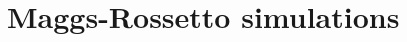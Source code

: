 \documentclass{article}[a4,12pt]
\begin{document}
\section*{Maggs-Rossetto simulations}
\end{document}
